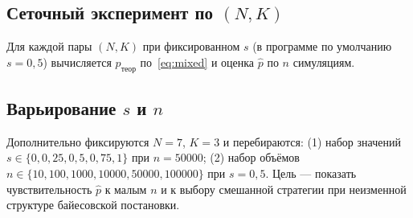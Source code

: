 \documentclass[a4paper, 14pt]{extarticle}
\begin{document}
\subsection{Сеточный эксперимент по $(N,K)$}
Для каждой пары $(N,K)$ при фиксированном $s$ (в программе по умолчанию $s=0{,}5$) вычисляется $p_{\text{теор}}$ по~\eqref{eq:mixed} и оценка $\hat p$ по $n$ симуляциям.

\subsection{Варьирование $s$ и $n$}
Дополнительно фиксируются $N=7$, $K=3$ и перебираются: (1) набор значений $s \in \{0{,}0{,}25{,}0{,}5{,}0{,}75{,}1\}$ при $n=50000$; (2) набор объёмов $n \in \{10,100,1000,10000,50000,100000\}$ при $s=0{,}5$. Цель --- показать чувствительность $\hat p$ к малым $n$ и к выбору смешанной стратегии при неизменной структуре байесовской постановки.
\end{document}
